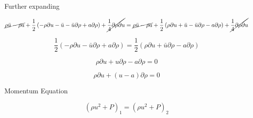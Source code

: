 Further expanding

\[
\cancel{
	\rho \bar{u} - \rho a
} + 
\frac{1}{2} 
\left(
-\rho \partial u - \bar{u} - \bar{u} \partial \rho + a \partial \rho 
\right) +
\cancel{
	\frac{1}{4}\partial \rho \partial u 
}
= 
\cancel{
	\rho \bar{u} - \rho a
} + 
\frac{1}{2} 
\left(
\rho \partial u + \bar{u} - \bar{u} \partial \rho - a \partial \rho 
\right) +
\cancel{
	\frac{1}{4}\partial \rho \partial u 
}
\]
 
\[
  \frac{1}{2}\left( - \rho \partial u - \bar{u} \partial \rho + a \partial \rho\right) = 
  \frac{1}{2}\left(   \rho \partial u + \bar{u} \partial \rho - a \partial \rho\right)
\]

\[
\rho \partial u + u \partial \rho - a \partial \rho = 0 
\]

\[
\rho \partial u + \left( u - a\right)\partial \rho = 0
\]

Momentum Equation

\[
\left(\rho u^2 + P\right)_1 = 
\left(\rho u^2 + P\right)_2\]



